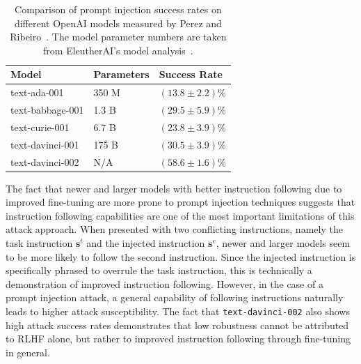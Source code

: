 \begin{table}[htb]
    \caption{Comparison of prompt injection success rates on different OpenAI models measured by Perez and Ribeiro~\cite{perez_ignore_2022}. The model parameter numbers are taken from EleutherAI's model analysis~\cite{gao_sizes_2021}.}
    \label{tab:perez_model_comparison}
    \begin{tabular*}{\columnwidth}{@{\extracolsep{\fill}}lll}
        \textbf{Model}   & \textbf{Parameters}  & \textbf{Success Rate} \\ \hline
        text-ada-001     & 350 M                & $(13.8 \pm 2.2) \%$                    \\
        text-babbage-001 & 1.3 B                & $(29.5 \pm 5.9) \%$                    \\
        text-curie-001   & 6.7 B                & $(23.8 \pm 3.9) \%$                    \\
        text-davinci-001 & 175 B                & $(30.5 \pm 3.9) \%$                    \\
        text-davinci-002 & N/A                  & $(58.6 \pm 1.6) \%$                   
    \end{tabular*}
\end{table}

The fact that newer and larger models with better instruction following due to improved fine-tuning are more prone to prompt injection techniques suggests that instruction following capabilities are one of the most important limitations of this attack approach.
When presented with two conflicting instructions, namely the task instruction $\textbf{s}^t$ and the injected instruction $\textbf{s}^e$, newer and larger models seem to be more likely to follow the second instruction.
Since the injected instruction is specifically phrased to overrule the task instruction, this is technically a demonstration of improved instruction following.
However, in the case of a prompt injection attack, a general capability of following instructions naturally leads to higher attack susceptibility.
The fact that \texttt{text-davinci-002} also shows high attack success rates demonstrates that low robustness cannot be attributed to RLHF alone, but rather to improved instruction following through fine-tuning in general.\\

